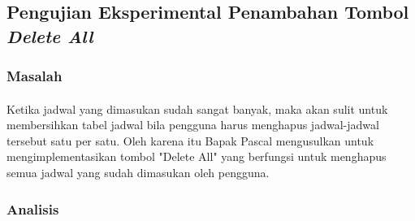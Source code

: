 \subsection{Pengujian Eksperimental Penambahan Tombol \textit{Delete All}}
\subsubsection{Masalah}
\paragraph{}Ketika jadwal yang dimasukan sudah sangat banyak, maka akan sulit untuk membersihkan tabel jadwal bila pengguna harus menghapus jadwal-jadwal tersebut satu per satu. Oleh karena itu Bapak Pascal mengusulkan untuk mengimplementasikan tombol "Delete All" yang berfungsi untuk menghapus semua jadwal yang sudah dimasukan oleh pengguna. 

\subsubsection{Analisis}
